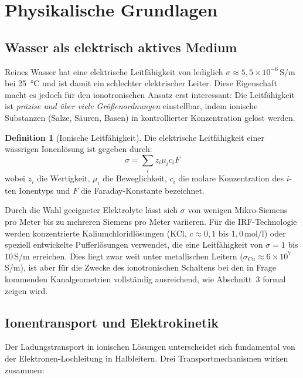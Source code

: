 ﻿\documentclass[a4paper,12pt]{scrreprt}
\theoremstyle{definition}
\newtheorem{definition}{Definition}[section]
\begin{document}
\section{Physikalische Grundlagen}

\subsection{Wasser als elektrisch aktives Medium}

Reines Wasser hat eine elektrische Leitfähigkeit von lediglich
$\sigma \approx 5{,}5 \times 10^{-6}$\,S/m bei 25\, °C und ist damit
ein schlechter elektrischer Leiter. Diese Eigenschaft macht es jedoch
für den ionotronischen Ansatz erst interessant: Die Leitfähigkeit ist
\emph{präzise und über viele Größenordnungen} einstellbar, indem ionische
Substanzen (Salze, Säuren, Basen) in kontrollierter Konzentration gelöst werden.

\begin{definition}[Ionische Leitfähigkeit]
	Die elektrische Leitfähigkeit einer wässrigen Ionenlösung ist gegeben durch:
	\begin{equation}
		\sigma = \sum_i z_i \mu_i c_i F
		\label{eq:leitfaehigkeit}
	\end{equation}
	wobei $z_i$ die Wertigkeit, $\mu_i$ die Beweglichkeit, $c_i$ die molare
	Konzentration des $i$-ten Ionentyps und $F$ die Faraday-Konstante bezeichnet.
\end{definition}

Durch die Wahl geeigneter Elektrolyte lässt sich $\sigma$ von wenigen
Mikro-Siemens pro Meter bis zu mehreren Siemens pro Meter variieren.
Für die IRF-Technologie werden konzentrierte Kaliumchloridlösungen
(KCl, $c \approx 0{,}1$ bis $1{,}0$\,mol/l) oder speziell entwickelte
Pufferlösungen verwendet, die eine Leitfähigkeit von $\sigma = 1$ bis
$10$\,S/m erreichen. Dies liegt zwar weit unter metallischen Leitern
($\sigma_{\mathrm{Cu}} \approx 6 \times 10^7$\,S/m), ist aber für die
Zwecke des ionotronischen Schaltens bei den in Frage kommenden
Kanalgeometrien vollständig ausreichend, wie Abschnitt~3 formal zeigen wird.

\subsection{Ionentransport und Elektrokinetik}

Der Ladungstransport in ionischen Lösungen unterscheidet sich fundamental
von der Elektronen-Lochleitung in Halbleitern. Drei Transportmechanismen
wirken zusammen:
\end{document}
